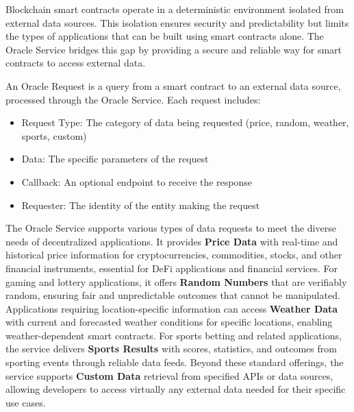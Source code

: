\documentclass[12pt,a4paper]{article}
\begin{document}
Blockchain smart contracts operate in a deterministic environment isolated from external data sources. This isolation ensures security and predictability but limits the types of applications that can be built using smart contracts alone. The Oracle Service bridges this gap by providing a secure and reliable way for smart contracts to access external data.



\begin{definition}
An Oracle Request is a query from a smart contract to an external data source, processed through the Oracle Service. Each request includes:
\begin{itemize}
    \item Request Type: The category of data being requested (price, random, weather, sports, custom)
    \item Data: The specific parameters of the request
    \item Callback: An optional endpoint to receive the response
    \item Requester: The identity of the entity making the request
\end{itemize}
\end{definition}

The Oracle Service supports various types of data requests to meet the diverse needs of decentralized applications. It provides \textbf{Price Data} with real-time and historical price information for cryptocurrencies, commodities, stocks, and other financial instruments, essential for DeFi applications and financial services. For gaming and lottery applications, it offers \textbf{Random Numbers} that are verifiably random, ensuring fair and unpredictable outcomes that cannot be manipulated. Applications requiring location-specific information can access \textbf{Weather Data} with current and forecasted weather conditions for specific locations, enabling weather-dependent smart contracts. For sports betting and related applications, the service delivers \textbf{Sports Results} with scores, statistics, and outcomes from sporting events through reliable data feeds. Beyond these standard offerings, the service supports \textbf{Custom Data} retrieval from specified APIs or data sources, allowing developers to access virtually any external data needed for their specific use cases.
\end{document}
